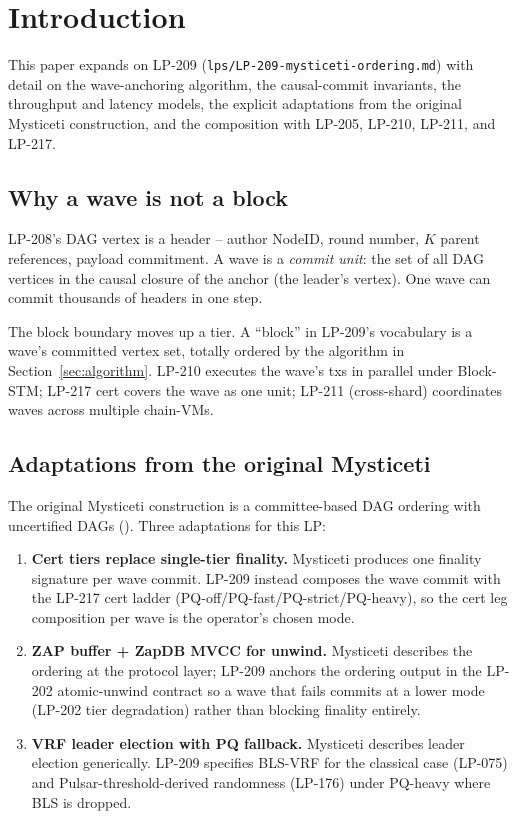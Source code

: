 \section{Introduction}

This paper expands on LP-209
(\texttt{lps/LP-209-mysticeti-ordering.md}) with detail on the
wave-anchoring algorithm, the causal-commit invariants, the
throughput and latency models, the explicit adaptations from the
original Mysticeti \cite{mysticeti2024} construction, and the
composition with LP-205, LP-210, LP-211, and LP-217.

\subsection{Why a wave is not a block}

LP-208's DAG vertex is a header -- author NodeID, round number, $K$
parent references, payload commitment. A wave is a \emph{commit
unit}: the set of all DAG vertices in the causal closure of the
anchor (the leader's vertex). One wave can commit thousands of
headers in one step.

The block boundary moves up a tier. A ``block'' in LP-209's
vocabulary is a wave's committed vertex set, totally ordered by the
algorithm in Section~\ref{sec:algorithm}. LP-210 executes the wave's
txs in parallel under Block-STM; LP-217 cert covers the wave as one
unit; LP-211 (cross-shard) coordinates waves across multiple
chain-VMs.

\subsection{Adaptations from the original Mysticeti}

The original Mysticeti construction is a committee-based DAG
ordering with uncertified DAGs (\cite{mysticeti2024}). Three
adaptations for this LP:

\begin{enumerate}[leftmargin=2em,nosep]
\item \textbf{Cert tiers replace single-tier finality.} Mysticeti
  produces one finality signature per wave commit. LP-209 instead
  composes the wave commit with the LP-217 cert ladder
  (PQ-off/PQ-fast/PQ-strict/PQ-heavy), so the cert leg composition
  per wave is the operator's chosen mode.
\item \textbf{ZAP buffer + ZapDB MVCC for unwind.} Mysticeti
  describes the ordering at the protocol layer; LP-209 anchors the
  ordering output in the LP-202 atomic-unwind contract so a wave
  that fails commits at a lower mode (LP-202 tier degradation)
  rather than blocking finality entirely.
\item \textbf{VRF leader election with PQ fallback.} Mysticeti
  describes leader election generically. LP-209 specifies BLS-VRF
  for the classical case (LP-075) and Pulsar-threshold-derived
  randomness (LP-176) under PQ-heavy where BLS is dropped.
\end{enumerate}

